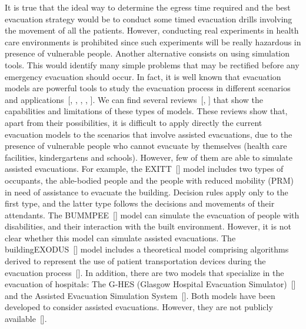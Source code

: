 \documentclass{style/llncs}
\begin{document}
It is true that the ideal way to determine the egress time required and the best evacuation 
 strategy would be to conduct some timed evacuation drills involving the movement of all the patients. However, conducting
 real experiments in health care environments is prohibited
since such experiments will be really hazardous in presence of vulnerable
people. Another alternative consists on using simulation tools. This would identify many simple problems that may be rectified before any emergency evacuation should occur. 
 In fact, it is well known that evacuation models are powerful tools to study the
evacuation process in different scenarios and
applications~[, , , , ]. We can find several reviews~[, ] that
show the capabilities and limitations of these types of models. These
reviews show that, apart from their possibilities, it is difficult to
apply directly the current evacuation models to the scenarios that
involve assisted evacuations, due to the presence of vulnerable people
who cannot evacuate by themselves (health care facilities, kindergartens
and schools). However, few of them are able to simulate assisted
evacuations. For example, the EXITT~[] model includes two types of
occupants, the able-bodied people and the people with reduced mobility
(PRM) in need of assistance to evacuate the building. Decision rules
apply only to the first type, and the latter type follows the decisions
and movements of their attendants. The BUMMPEE~[] model can simulate the
evacuation of people with disabilities, and their interaction with the
built environment. However, it is not clear whether this model can
simulate assisted evacuations. The buildingEXODUS~[] model includes a
theoretical model comprising algorithms derived to represent the use of
patient transportation devices during the evacuation process~[]. In
addition, there are two models that specialize in the evacuation of
hospitals: The G-HES (Glasgow Hospital Evacuation Simulator)~[] and the
Assisted Evacuation Simulation System~[]. Both models have been
developed to consider assisted evacuations. However, they are not
publicly available~[].%
\end{document}
